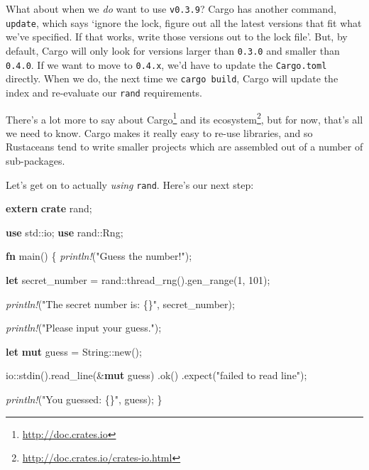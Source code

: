 \documentclass[a4paper,]{book}
\newenvironment{Shaded}{\begin{snugshade}}{\end{snugshade}}
\newcommand{\KeywordTok}[1]{\textcolor[rgb]{0.13,0.29,0.53}{\textbf{{#1}}}}
\newcommand{\DataTypeTok}[1]{\textcolor[rgb]{0.13,0.29,0.53}{{#1}}}
\newcommand{\DecValTok}[1]{\textcolor[rgb]{0.00,0.00,0.81}{{#1}}}
\newcommand{\StringTok}[1]{\textcolor[rgb]{0.31,0.60,0.02}{{#1}}}
\newcommand{\PreprocessorTok}[1]{\textcolor[rgb]{0.56,0.35,0.01}{\textit{{#1}}}}
\newcommand{\NormalTok}[1]{{#1}}
\renewcommand{\href}[2]{#2\footnote{\url{#1}}}
\begin{document}
What about when we \emph{do} want to use \texttt{v0.3.9}? Cargo has
another command, \texttt{update}, which says `ignore the lock, figure
out all the latest versions that fit what we've specified. If that
works, write those versions out to the lock file'. But, by default,
Cargo will only look for versions larger than \texttt{0.3.0} and smaller
than \texttt{0.4.0}. If we want to move to \texttt{0.4.x}, we'd have to
update the \texttt{Cargo.toml} directly. When we do, the next time we
\texttt{cargo\ build}, Cargo will update the index and re-evaluate our
\texttt{rand} requirements.

There's a lot more to say about \href{http://doc.crates.io}{Cargo} and
\href{http://doc.crates.io/crates-io.html}{its ecosystem}, but for now,
that's all we need to know. Cargo makes it really easy to re-use
libraries, and so Rustaceans tend to write smaller projects which are
assembled out of a number of sub-packages.

Let's get on to actually \emph{using} \texttt{rand}. Here's our next
step:

\begin{Shaded}
\begin{Highlighting}[]
\KeywordTok{extern} \KeywordTok{crate} \NormalTok{rand;}

\KeywordTok{use} \NormalTok{std::io;}
\KeywordTok{use} \NormalTok{rand::Rng;}

\KeywordTok{fn} \NormalTok{main() \{}
    \PreprocessorTok{println!}\NormalTok{(}\StringTok{"Guess the number!"}\NormalTok{);}

    \KeywordTok{let} \NormalTok{secret_number = rand::thread_rng().gen_range(}\DecValTok{1}\NormalTok{, }\DecValTok{101}\NormalTok{);}

    \PreprocessorTok{println!}\NormalTok{(}\StringTok{"The secret number is: \{\}"}\NormalTok{, secret_number);}

    \PreprocessorTok{println!}\NormalTok{(}\StringTok{"Please input your guess."}\NormalTok{);}

    \KeywordTok{let} \KeywordTok{mut} \NormalTok{guess = }\DataTypeTok{String}\NormalTok{::new();}

    \NormalTok{io::stdin().read_line(&}\KeywordTok{mut} \NormalTok{guess)}
        \NormalTok{.ok()}
        \NormalTok{.expect(}\StringTok{"failed to read line"}\NormalTok{);}

    \PreprocessorTok{println!}\NormalTok{(}\StringTok{"You guessed: \{\}"}\NormalTok{, guess);}
\NormalTok{\}}
\end{Highlighting}
\end{Shaded}
\end{document}
